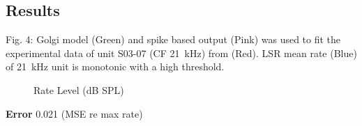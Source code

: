 \clearpage
\subsection{Results}
Fig. 4: Golgi model (Green) and spike based output (Pink) was used to
fit the experimental data of unit S03-07 (CF 21~kHz) from
\citep{GhoshalKim:1996} (Red).  LSR mean rate (Blue) of 21~kHz unit is
monotonic with a high threshold.



\begin{figure}[htb]
  \centering {}
  \caption{Rate Level (dB SPL)}
\end{figure}


\textbf{Error} 0.021 (MSE re max rate)











